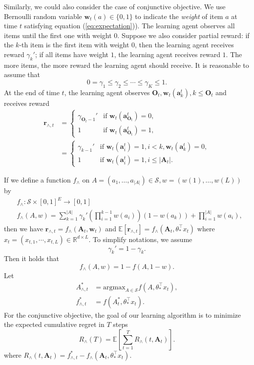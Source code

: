 \documentclass{article}
\newcommand{\EE}{\mathbb{E}}
\newcommand{\RR}{\mathbb{R}}
\newcommand{\bA}{\mathbf{A}}
\newcommand{\ba}{\mathbf{a}}
\newcommand{\bO}{\mathbf{O}}
\newcommand{\br}{\mathbf{r}}
\newcommand{\bw}{\mathbf{w}}
\newcommand{\cS}{\mathcal{S}}
\newcommand{\argmax}{\mathrm{argmax}}
\newcommand{\abs}[1]{\left| #1 \right|}
\begin{document}
Similarly, we could also consider the case of conjunctive objective. We use Bernoulli random variable $\bw_{t}(a) \in \{0,1\}$ to indicate the {\it weight} of item $a$ at time $t$ satisfying equation (\ref{eq:expectation})). The learning agent observes all items until the first one with weight $0$. Suppose we also consider partial reward: if the $k$-th item is the first item with weight $0$, then the learning agent receives reward $\gamma_k'$; if all items have weight $1$, the learning agent receives reward $1$. The more items, the more reward the learning agent should receive. It is reasonable to assume that
$$
0 = \gamma_1 \leq \gamma_2 \leq \cdots \leq \gamma_K \leq 1.
$$
At the end of time $t$, the learning agent observes $\bO_t, \bw_t(\ba_k^t), k \leq \bO_t$ and receives reward
\begin{align*}
\br_{\wedge, t} &= \begin{cases}
\gamma_{\bO_t - 1}'  &\text{if } \bw_t(\ba_{\bO_t}^t) = 0,\\
1 &\text{if } \bw_t(\ba_{\bO_t}^t) = 1,
\end{cases}\\
&=\begin{cases}
\gamma_{k - 1}'  &\text{if } \bw_t(\ba_{i}^t) = 1, i < k, \bw_t(\ba_{k}^t) = 0,\\
1 &\text{if } \bw_t(\ba_{i}^t) = 1, i\leq \abs{\bA_t}.
\end{cases}
\end{align*}

If we define a function $f_{\wedge}$ on $A = (a_1, \ldots, a_{\abs{A}}) \in \cS, w = (w(1), \ldots, w(L))$ by
\begin{align*}
&f_{\wedge} : \cS \times [0,1]^E \to [0,1]\\
&f_{\wedge}(A,w) = \sum_{k = 1}^{\abs{A}} \gamma_k' (\prod_{i = 1}^{k - 1} w(a_i))(1 - w(a_k)) + \prod_{i=1}^{\abs{A}}w(a_i),
\end{align*}
then we have $\br_{\wedge, t} = f_{\wedge}(\bA_t, \bw_t)$ and $\EE[\br_{\wedge, t}] = f_{\wedge}(\bA_t, \theta_{\ast}^{\top}x_t)$ where $x_t = (x_{t,1}, \cdots, x_{t,L}) \in \RR^{d \times L}$. To simplify notations, we assume 
$$
\gamma_k' = 1 - \gamma_k.
$$
Then it holds that
\begin{equation}
\label{eq:ConDisRelation}
f_{\wedge}(A, w) = 1 - f(A, 1 - w).
\end{equation}
Let 
\begin{align*}
A_{\wedge, t}^{\ast} &= \argmax_{A\in \cS} f(A,\theta_{\ast}^{\top}x_t),\\
f_{\wedge, t}^{\ast} &= f(A_t^{\ast}, \theta_{\ast}^{\top}x_t).
\end{align*}
For the conjunctive objective, the goal of our learning algorithm is to minimize the expected cumulative regret in $T$ steps
$$
R_{\wedge}(T) = \EE[\sum_{t=1}^T R_{\wedge}(t, \bA_t)].
$$
where $R_{\wedge}(t, \bA_t) = f_{\wedge, t}^{\ast} - f_{\wedge}(\bA_t, \theta_{\ast}^{\top}x_t)$.
\end{document}
